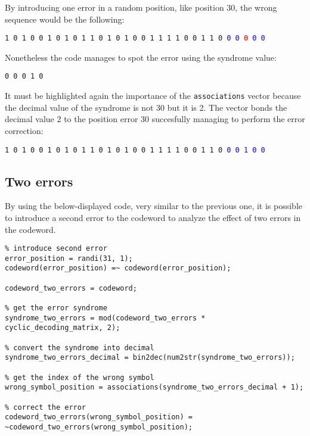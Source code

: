 \noindent By introducing one error in a random position, like position 30, the wrong sequence would be the following:

\begin{center}
    \texttt{1 0 1 0 0 1 0 1 0 1 1 0 1 0 1 0 0 1 1 1 1 0 0 1 1 0 }\textcolor{blue}{\texttt{0 0 }}\textcolor{red}{\texttt{0 }}\textcolor{blue}{\texttt{0 0}}
\end{center}

\noindent Nonetheless the code manages to spot the error using the syndrome value:

\begin{center}
    \texttt{0 0 0 1 0}
\end{center}

\noindent It must be highlighted again the importance of the \texttt{associations} vector because the decimal value of the syndrome is not 30 but it is 2. The vector bonds the decimal value 2 to the position error 30 succesfully managing to perform the error correction:
\begin{center}
    \texttt{1 0 1 0 0 1 0 1 0 1 1 0 1 0 1 0 0 1 1 1 1 0 0 1 1 0 }\textcolor{blue}{\texttt{0 0 1 0 0}}
\end{center}


\subsection{Two errors} \label{two-errors-correction}
By using the below-displayed code, very similar to the previous one, it is possible to introduce a second error to the codeword to analyze the effect of two errors in the codeword. 

\begin{lstlisting}
% introduce second error
error_position = randi(31, 1);
codeword(error_position) =~ codeword(error_position);

codeword_two_errors = codeword;

% get the error syndrome
syndrome_two_errors = mod(codeword_two_errors * cyclic_decoding_matrix, 2);

% convert the syndrome into decimal
syndrome_two_errors_decimal = bin2dec(num2str(syndrome_two_errors));

% get the index of the wrong symbol
wrong_symbol_position = associations(syndrome_two_errors_decimal + 1);

% correct the error
codeword_two_errors(wrong_symbol_position) = ~codeword_two_errors(wrong_symbol_position);
\end{lstlisting}

